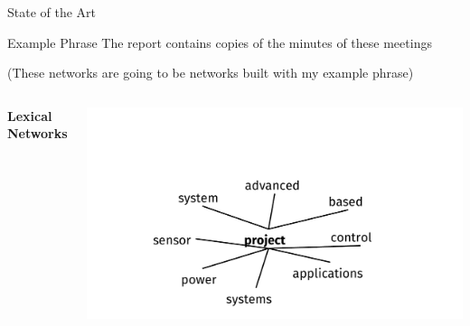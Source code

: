 \documentclass[10pt,xcolor=table]{beamer}
\begin{document}
\begin{frame}{State of the Art}






\begin{block}{Example Phrase}
The report contains copies of the minutes of these meetings
\end{block}
(These networks are going to be networks built with my example phrase)
\vspace{.5cm}

	\begin{columns}


		\textbf{\normalsize Lexical Networks}
		\begin{minipage}[c][0.3\textheight][c]{\linewidth}
		\includegraphics[width=1\linewidth]{image2/Chapitre2/lex_net1.pdf}
		\end{minipage}


\end{columns}
\end{frame}
\end{document}
